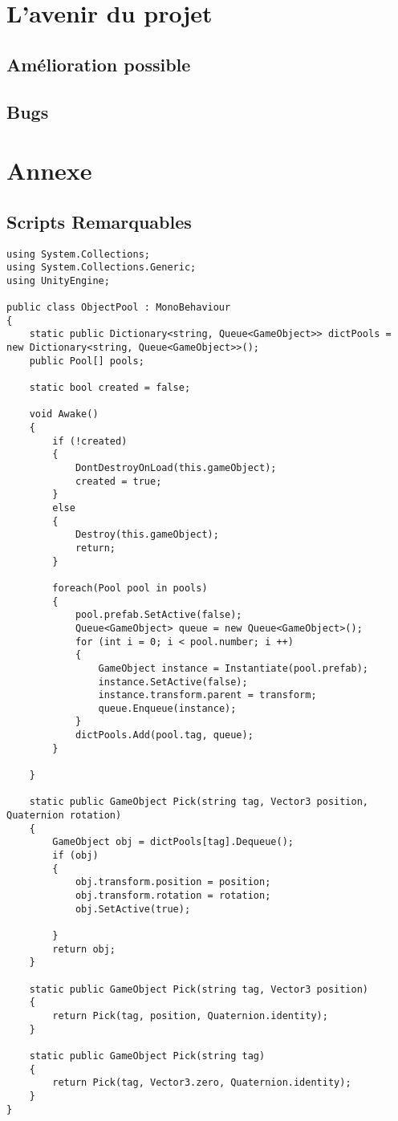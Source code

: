 \documentclass{report}
\begin{document}
\newpage
\part{L'avenir du projet}
\chapter{Amélioration possible}
\chapter{Bugs}
\newpage
\part{Annexe}
\chapter{Scripts Remarquables}
 \begin{lstlisting}[language={[Sharp]C},label={lst:ObjectPoolScript}, caption= Script ObjectPool.cs]
using System.Collections;
using System.Collections.Generic;
using UnityEngine;

public class ObjectPool : MonoBehaviour
{
    static public Dictionary<string, Queue<GameObject>> dictPools = new Dictionary<string, Queue<GameObject>>();
    public Pool[] pools;

    static bool created = false;

    void Awake()
    {
        if (!created)
        {
            DontDestroyOnLoad(this.gameObject);
            created = true;
        }
        else
        {
            Destroy(this.gameObject);
            return;
        }

        foreach(Pool pool in pools)
        {
            pool.prefab.SetActive(false);
            Queue<GameObject> queue = new Queue<GameObject>();
            for (int i = 0; i < pool.number; i ++)
            {
                GameObject instance = Instantiate(pool.prefab);
                instance.SetActive(false);
                instance.transform.parent = transform;
                queue.Enqueue(instance);
            }
            dictPools.Add(pool.tag, queue);
        }

    }

    static public GameObject Pick(string tag, Vector3 position, Quaternion rotation)
    {
        GameObject obj = dictPools[tag].Dequeue();
        if (obj)
        {
            obj.transform.position = position;
            obj.transform.rotation = rotation;
            obj.SetActive(true);
            
        }
        return obj;
    }

    static public GameObject Pick(string tag, Vector3 position)
    {
        return Pick(tag, position, Quaternion.identity);
    }

    static public GameObject Pick(string tag)
    {
        return Pick(tag, Vector3.zero, Quaternion.identity);
    }
}
\end{lstlisting}








%
%
\end{document}
